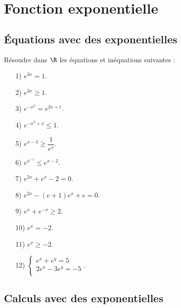 \chapter{Fonction exponentielle}

\section{Équations avec des exponentielles}

Résoudre dans $\R$ les équations et inéquations suivantes : \\

\begin{itemize}
\item[1)] $e^{3x} = 1$. \\
\item[2)] $e^{3x} \geqslant 1$. \\
\item[3)] $e^{-x^2} = e^{2x+1}$. \\
\item[4)] $e^{-x^2 + x} \leqslant 1$. \\
\item[5)] $e^{x-3} \geqslant \dfrac{1}{e^x}$. \\
\item[6)] $e^{x^{-1}} \leqslant e^{x-2}$. \\
\item[7)] $e^{2x} + e^x - 2 = 0$. \\
\item[8)] $e^{2x} - \left(e+1\right)e^x + e = 0$. \\
\item[9)] $e^x + e^{-x} \geqslant 2$. \\
\item[10)] $e^x = -2$. \\
\item[11)] $e^x \geqslant -2$. \\
\item[12)] $\left\{
  \begin{array}{l}
   e^x + e^y = 5 \\
   2e^x - 3e^y = -5 \\
  \end{array}
\right.$.
\end{itemize}

\newpage

\section{Calculs avec des exponentielles}

